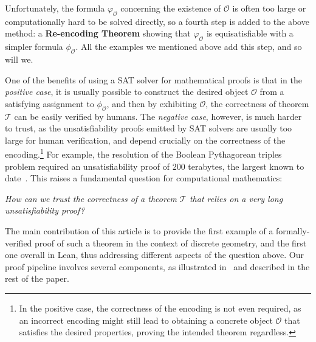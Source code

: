 Unfortunately, the formula $\varphi_{\mathcal{O}}$ concerning the existence of $\mathcal{O}$ is often too large or computationally hard to be solved directly, so a fourth step is added to the above method: a \textbf{Re-encoding Theorem} showing that $\varphi_{\mathcal{O}}$ is equisatisfiable with a simpler formula $\phi_{\mathcal{O}}$.
All the examples we mentioned above add this step, and so will we.

One of the benefits of using a SAT solver for mathematical proofs is that in the \emph{positive case}, it is usually possible to construct the desired object $\mathcal{O}$ from a satisfying assignment to $\phi_{\mathcal{O}}$, and then by exhibiting $\mathcal{O}$, the correctness of theorem $\mathcal{T}$ can be easily verified by humans.
The \emph{negative case}, however, is much harder to trust, as the unsatisfiability proofs emitted by SAT solvers are usually too large for human verification, and depend crucially on the correctness of the encoding.\footnote{In the positive case, the correctness of the encoding is not even required, as an incorrect encoding might still lead to obtaining a concrete object $\mathcal{O}$ that satisfies the desired properties, proving the intended theorem regardless.}
For example, the resolution of the Boolean Pythagorean triples problem required an unsatisfiability proof of 200 terabytes, the largest known to date~\cite{Heule_2016,lambTwohundredterabyteMathsProof2016}.
This raises a fundamental question for computational mathematics:
\begin{center}
  \emph{How can we trust the correctness of a theorem $\mathcal{T}$ that relies on a very long unsatisfiability proof?}
\end{center}

The main contribution of this article is to provide the first example of a formally-verified proof of such a theorem in the context of discrete geometry, and the first one overall in Lean, thus addressing different aspects of the question above.
Our proof pipeline involves several components, as illustrated in~ and described in the rest of the paper.

